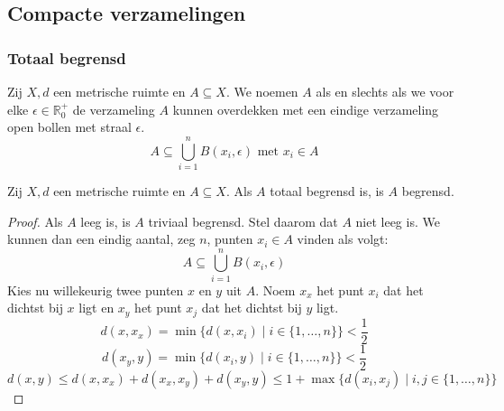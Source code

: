 \documentclass[main.tex]{subfiles}
\begin{document}
\subsection{Compacte verzamelingen}
\label{sec:comp-verz}


\subsubsection{Totaal begrensd}
\label{sec:totaal-begrensd}

\begin{de}
  Zij $X,d$ een metrische ruimte en $A \subseteq X$.
  We noemen $A$  als en slechts als we voor elke $\epsilon \in \mathbb{R}_{0}^{+}$ de verzameling $A$ kunnen overdekken met een eindige verzameling open bollen met straal $\epsilon$.
  \[ A \subseteq \bigcup_{i=1}^{n}B(x_{i},\epsilon) \text{ met } x_{i} \in A \]
\end{de}

\begin{bpr}
  Zij $X,d$ een metrische ruimte en $A \subseteq X$.
  Als $A$ totaal begrensd is, is $A$ begrensd.

  \begin{proof}
    Als $A$ leeg is, is $A$ triviaal begrensd.
    Stel daarom dat $A$ niet leeg is.
    We kunnen dan een eindig aantal, zeg $n$, punten $x_{i}\in A$ vinden als volgt:
    \[ A \subseteq \bigcup_{i=1}^{n}B(x_{i},\epsilon) \]
    Kies nu willekeurig twee punten $x$ en $y$ uit $A$.
    Noem $x_{x}$ het punt $x_{i}$ dat het dichtst bij $x$ ligt en $x_{y}$ het punt $x_{j}$ dat het dichtst bij $y$ ligt.
    \[ d(x,x_{x}) = \min\{ d(x,x_{i}) \mid i \in \{ 1,\dotsc,n \}\} < \frac{1}{2} \]
    \[ d(x_{y},y) = \min\{ d(x_{i},y) \mid i \in \{ 1,\dotsc,n \}\} < \frac{1}{2} \]
    \[ d(x,y) \le d(x,x_{x}) + d(x_{x},x_{y}) + d(x_{y},y) \le 1 + \max\{ d(x_{i},x_{j}) \mid i,j \in \{1,\dotsc,n\} \} \]
  \end{proof}
\end{bpr}
\end{document}
